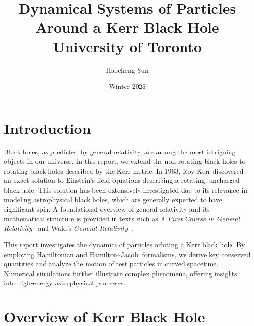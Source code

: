 \documentclass{article}
\title{Dynamical Systems of Particles Around a Kerr Black Hole\\
{\Large University of Toronto}}
\author{Haocheng Sun}
\date{Winter 2025}
\theoremstyle{remark}
\begin{document}
\maketitle



\section{Introduction}

Black holes, as predicted by general relativity, are among the most intriguing objects in our universe. In this report, we extend the non-rotating black holes to rotating black holes described by the Kerr metric.  In 1963, Roy Kerr discovered an exact solution to Einstein's 
field equations describing a rotating, uncharged black hole. This solution has been extensively investigated due to its relevance in modeling 
astrophysical black holes, which are generally expected to have significant spin. A foundational 
overview of general relativity and its mathematical structure is provided in texts such 
as \emph{A First Course in General Relativity}~\cite{schutz} and Wald's \emph{General 
Relativity}~\cite{wald}.

This report investigates the dynamics of particles orbiting a Kerr black hole. By employing Hamiltonian and Hamilton–Jacobi formalisms, we derive key conserved quantities and analyze the motion of test particles in curved spacetime. Numerical simulations further illustrate complex phenomena, offering insights into high-energy astrophysical processes.



\section{Overview of Kerr Black Hole}
\end{document}
